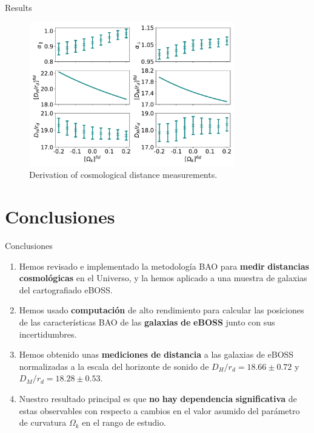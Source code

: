 \documentclass{beamer}
\begin{document}
\begin{frame}{Results}
	\begin{figure}[t]
		\centering
		\includegraphics[width=0.8\textwidth]{../figs/phase2_DA_DH_flat.pdf}
		\caption{Derivation of cosmological distance measurements.}
		\label{fig:phase2}
	\end{figure}
	 
\end{frame}

\section{Conclusiones}
\begin{frame}[allowframebreaks]{Conclusiones}

\begin{enumerate}
\item Hemos revisado e implementado la metodología BAO para \textbf{medir} \textbf{distancias} \textbf{cosmológicas} en el Universo, y la hemos aplicado a una muestra de galaxias del cartografiado eBOSS.
\item Hemos usado \textbf{computación} de alto rendimiento para calcular las posiciones de las características BAO de las \textbf{galaxias} \textbf{de} \textbf{eBOSS} junto con sus incertidumbres. 
\item Hemos obtenido unas \textbf{mediciones} \textbf{de} \textbf{distancia} a las galaxias de eBOSS normalizadas a la escala del horizonte de sonido de $D_H/r_d = 18.66 \pm 0.72$ y $D_M/r_d = 18.28 \pm 0.53$.
\item Nuestro resultado principal es que \textbf{no} \textbf{hay} \textbf{dependencia} \textbf{significativa} de estas observables con respecto a cambios en el valor asumido del parámetro de curvatura $ \Omega_k$ en el rango de estudio.
\end{enumerate}

\end{frame}
\end{document}
